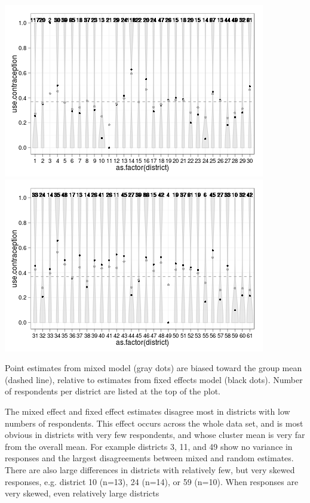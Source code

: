\documentclass{article}
\makeatletter
\newenvironment{kframe}{%
 \def\FrameCommand##1{\hskip\@totalleftmargin \hskip-\fboxsep
 \colorbox{shadecolor}{##1}\hskip-\fboxsep
     \hskip-\linewidth \hskip-\@totalleftmargin \hskip\columnwidth}%
 \MakeFramed {\advance\hsize-\width
   \@totalleftmargin\z@ \linewidth\hsize
   \@setminipage}}%
 {\par\unskip\endMakeFramed}
\newenvironment{knitrout}{}{} %
\makeatother
\begin{document}
\begin{knitrout}
{\begin{kframe}
\centering{}\includegraphics{compare-plot1} \includegraphics{compare-plot2} 

\end{kframe}}
\end{knitrout}


Point estimates from mixed model (gray dots) are biased toward the group mean (dashed line), relative to estimates from fixed effects model (black dots).
Number of respondents per district are listed at the top of the plot. 


The mixed effect and fixed effect estimates disagree most in districts with low numbers of respondents. 
This effect occurs across the whole data set, and is most obvious in districts with very few respondents, and whose cluster mean is very far from the overall mean. 
For example districts 3, 11, and 49 show no variance in responses and the largest disagreements between mixed and random estimates. 
There are also large differences in districts with relatively few, but very skewed responses, e.g. district 10 (n=13), 24 (n=14), or 59 (n=10).
When responses are very skewed, even relatively large districts 
\end{document}
